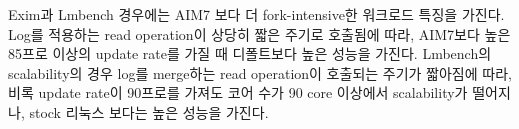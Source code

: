 Exim과 Lmbench 경우에는 AIM7 보다 더 fork-intensive한 워크로드 특징을 가진다.
Log를 적용하는 read operation이 상당히 짧은 주기로 호출됨에 따라, AIM7보다 높은 85프로 이상의 update rate를 가질
때 디폴트보다 높은 성능을 가진다.
Lmbench의 scalability의 경우 log를 merge하는 read operation이 호출되는 주기가 짧아짐에 따라, 비록
update rate이 90프로를 가져도 코어 수가 90 core 이상에서 scalability가 떨어지나, stock 리눅스 보다는
높은 성능을 가진다. 

\else

\fi















